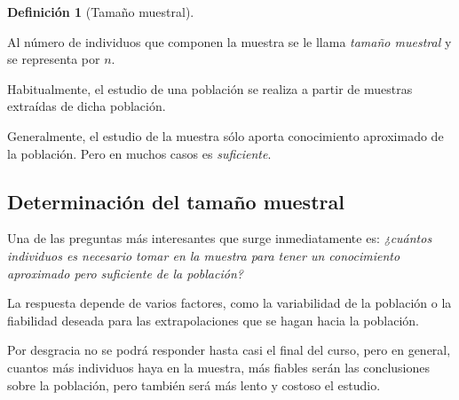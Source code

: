 \documentclass[
  spanish,
  a4paper,
]{scrreport}
\theoremstyle{plain}
\theoremstyle{definition}
\theoremstyle{definition}
\newtheorem{definition}{Definición}[chapter]
\theoremstyle{remark}
\begin{document}
\begin{definition}[Tamaño
muestral]\protect\hypertarget{def-tamaño-muestral}{}\label{def-tamaño-muestral}

Al número de individuos que componen la muestra se le llama \emph{tamaño
muestral} y se representa por \(n\).

\end{definition}

Habitualmente, el estudio de una población se realiza a partir de
muestras extraídas de dicha población.

Generalmente, el estudio de la muestra sólo aporta conocimiento
aproximado de la población. Pero en muchos casos es \emph{suficiente}.

\subsection{Determinación del tamaño
muestral}\label{determinaciuxf3n-del-tamauxf1o-muestral}

Una de las preguntas más interesantes que surge inmediatamente es:
\emph{¿cuántos individuos es necesario tomar en la muestra para tener un
conocimiento aproximado pero suficiente de la población?}

La respuesta depende de varios factores, como la variabilidad de la
población o la fiabilidad deseada para las extrapolaciones que se hagan
hacia la población.

Por desgracia no se podrá responder hasta casi el final del curso, pero
en general, cuantos más individuos haya en la muestra, más fiables serán
las conclusiones sobre la población, pero también será más lento y
costoso el estudio.
\end{document}
